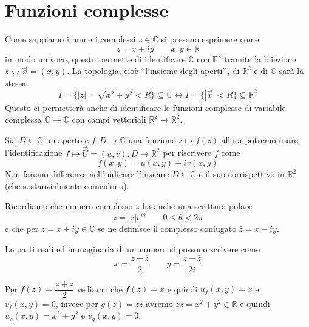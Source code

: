\documentclass[11pt,a4paper,twoside]{book}
\newenvironment{esempio}[1][Esempio]{ 
  \begin{center}\begin{tcolorbox}[
  title={#1:~},
  width=0.9\linewidth,
  flush right,
  enhanced jigsaw, 
  colback=white, 
  frame hidden, 
  sharpish corners, arc=3mm,
  borderline west = {1pt}{0pt}{gray},
  borderline south = {1pt}{0pt}{gray},
  coltitle=black, 
  fonttitle=\small\bfseries, 
  attach title to upper, 
  breakable,
  top=2.5pt, bottom=0.3pt]\small
  }{
 \normalsize \end{tcolorbox}\end{center}
}
\theoremstyle{esss}
\theoremstyle{dotless}
\numberwithin{equation}{section} %
\begin{document}
\section{Funzioni complesse}
\pagestyle{fancy}
Come sappiamo i numeri complessi $z\in\mathbb{C}$ si possono esprimere come
\[
z=x+iy \qquad x,y\in\mathbb{R}
\]
in modo univoco, questo permette di identificare $\mathbb{C}$ con $\mathbb{R}^2$ tramite la biiezione $z\leftrightarrow \vec{x}=(x,y)$.
La topologia, cioè ``l`insieme degli aperti'', di $\mathbb{R}^2$ e di $\mathbb{C}$ sarà la stessa 
\[
I=\{|z|=\sqrt{x^2+y^2}<R\}\subseteq\mathbb{C} \leftrightarrow I=\{|\vec{x}|<R\}\subseteq\mathbb{R}^2
\]
Questo ci permetterà anche di identificare le funzioni complesse di variabile complessa $\mathbb{C}\rightarrow\mathbb{C}$ con campi vettoriali $\mathbb{R}^2\rightarrow\mathbb{R}^2$.

Sia $D\subseteq\mathbb{C}$ un aperto e $f:D\rightarrow\mathbb{C}$ una funzione $z\mapsto f(z)$ allora potremo usare l'identificazione $f\mapsto\vec{U}=(u,v):D\rightarrow\mathbb{R}^2$ per riscrivere $f$ come
\[
f(x,y)=u(x,y)+iv(x,y)
\]
Non faremo differenze nell'indicare l'insieme $D\subseteq\mathbb{C}$ e il suo corrispettivo in $\mathbb{R}^2$ (che sostanzialmente coincidono).

Ricordiamo che numero complesso $z$ ha anche una scrittura polare
\[
z=|z|e^{i\theta} \qquad 0\leq\theta<2\pi
\]
e che per $z=x+iy\in\mathbb{C}$ se ne definisce il complesso coniugato $\overline{z}=x-iy$.

Le parti reali ed immaginaria di un numero si possono scrivere come 
\[
x=\dfrac{z+\overline{z}}{2} \qquad y=\dfrac{z-\overline{z}}{2i}
\]

\begin{esempio}
Per $f(z)=\dfrac{z+\overline{z}}{2}$ vediamo che $f(z)=x$ e quindi $u_f(x,y)=x$ e $v_f(x,y)=0$, invece per $g(z)=z\overline{z}$ avremo $z\overline{z}=x^2+y^2\in\mathbb{R}$ e quindi $u_g(x,y)=x^2+y^2$ e $v_g(x,y)=0$.
\end{esempio}
\end{document}
